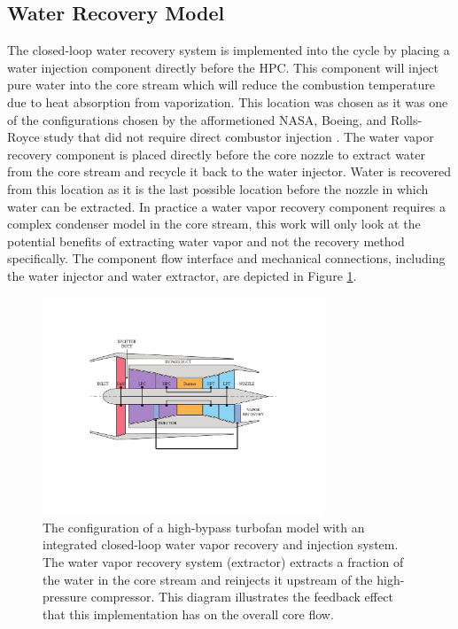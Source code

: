 \documentclass[conf]{new-aiaa}
\begin{document}
\subsection{Water Recovery Model}
The closed-loop water recovery system is implemented into the cycle by placing a water injection component directly before the HPC.
This component will inject pure water into the core stream which will reduce the combustion temperature due to heat absorption from vaporization.
This location was chosen as it was one of the configurations chosen by the afformetioned NASA, Boeing, and Rolls-Royce study that did not require direct combustor injection \cite{nasa_inject}.
The water vapor recovery component is placed directly before the core nozzle to extract water from the core stream and recycle it back to the water injector.
Water is recovered from this location as it is the last possible location before the nozzle in which water can be extracted.
In practice a water vapor recovery component requires a complex condenser model in the core stream, this work will only look at the potential benefits of extracting water vapor and not the recovery method specifically.
The component flow interface and mechanical connections, including the water injector and water extractor, are depicted in Figure \ref{fig:hbtf_cycle}.

\begin{figure}[!hbt]
    \centering
    \includegraphics[width=0.75\textwidth]{turbofan_wvr.pdf}
    \caption{
        The configuration of a high-bypass turbofan model with an integrated closed-loop water vapor recovery and injection system.
        The water vapor recovery system (extractor) extracts a fraction of the water in the core stream and reinjects it upstream of the high-pressure compressor.
        This diagram illustrates the feedback effect that this implementation has on the overall core flow.}
    \label{fig:hbtf_cycle}
\end{figure}
\end{document}
